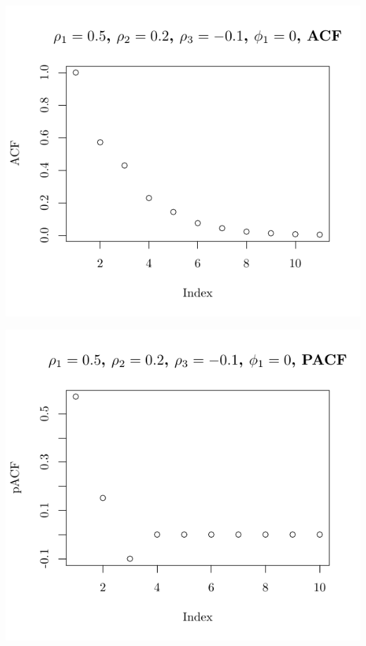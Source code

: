\documentclass[10pt]{paper}\usepackage[]{graphicx}\usepackage[]{color}
\makeatletter
\def\maxwidth{ %
  \ifdim\Gin@nat@width>\linewidth
    \linewidth
  \else
    \Gin@nat@width
  \fi
}
\newenvironment{knitrout}{}{} %
\makeatother
\begin{document}
\begin{knitrout}
{\centering \includegraphics[width=\maxwidth]{figure/graphics-plotter-109} 

}




{\centering \includegraphics[width=\maxwidth]{figure/graphics-plotter-110} 

}





\end{knitrout}
\end{document}
